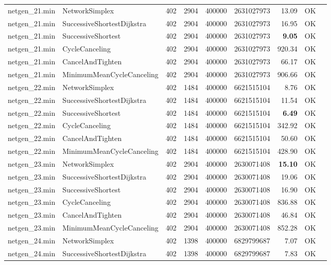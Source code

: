 \begin{longtable}{llrrrrrrl}
\midrule
netgen\_21.min & NetworkSimplex & 402 & 2904 & 400000 & 2631027973 & 13.09 & OK \\
netgen\_21.min & SuccessiveShortestDijkstra & 402 & 2904 & 400000 & 2631027973 & 16.95 & OK \\
netgen\_21.min & SuccessiveShortest & 402 & 2904 & 400000 & 2631027973 & \textbf{9.05} & OK \\
netgen\_21.min & CycleCanceling & 402 & 2904 & 400000 & 2631027973 & 920.34 & OK \\
netgen\_21.min & CancelAndTighten & 402 & 2904 & 400000 & 2631027973 & 66.17 & OK \\
netgen\_21.min & MinimumMeanCycleCanceling & 402 & 2904 & 400000 & 2631027973 & 906.66 & OK \\
\midrule
netgen\_22.min & NetworkSimplex & 402 & 1484 & 400000 & 6621515104 & 8.76 & OK \\
netgen\_22.min & SuccessiveShortestDijkstra & 402 & 1484 & 400000 & 6621515104 & 11.54 & OK \\
netgen\_22.min & SuccessiveShortest & 402 & 1484 & 400000 & 6621515104 & \textbf{6.49} & OK \\
netgen\_22.min & CycleCanceling & 402 & 1484 & 400000 & 6621515104 & 342.92 & OK \\
netgen\_22.min & CancelAndTighten & 402 & 1484 & 400000 & 6621515104 & 50.60 & OK \\
netgen\_22.min & MinimumMeanCycleCanceling & 402 & 1484 & 400000 & 6621515104 & 428.90 & OK \\
\midrule
netgen\_23.min & NetworkSimplex & 402 & 2904 & 400000 & 2630071408 & \textbf{15.10} & OK \\
netgen\_23.min & SuccessiveShortestDijkstra & 402 & 2904 & 400000 & 2630071408 & 19.06 & OK \\
netgen\_23.min & SuccessiveShortest & 402 & 2904 & 400000 & 2630071408 & 16.90 & OK \\
netgen\_23.min & CycleCanceling & 402 & 2904 & 400000 & 2630071408 & 836.88 & OK \\
netgen\_23.min & CancelAndTighten & 402 & 2904 & 400000 & 2630071408 & 46.84 & OK \\
netgen\_23.min & MinimumMeanCycleCanceling & 402 & 2904 & 400000 & 2630071408 & 852.28 & OK \\
\midrule
netgen\_24.min & NetworkSimplex & 402 & 1398 & 400000 & 6829799687 & 7.07 & OK \\
netgen\_24.min & SuccessiveShortestDijkstra & 402 & 1398 & 400000 & 6829799687 & 7.83 & OK \\

\end{longtable}
